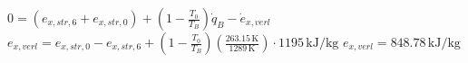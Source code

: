 \( 0 = (e_{x,str,6} + e_{x,str,0}) + (1 - \frac{T_0}{T_B}) \dot{q}_B - \dot{e}_{x,verl} \)  
\( e_{x,verl} = e_{x,str,0} - e_{x,str,6} + (1 - \frac{T_0}{T_B}) \left(\frac{263.15 \, \text{K}}{1289 \, \text{K}}\right) \cdot 1195 \, \text{kJ/kg} \)  
\( e_{x,verl} = 848.78 \, \text{kJ/kg} \)